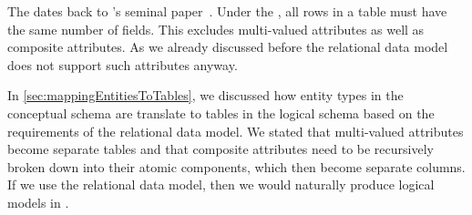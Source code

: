 %
\label{sec:normalForm:1}%
%
The  dates back to \citeauthor{C1970ARMODFLSDB}'s seminal paper~\cite{C1970ARMODFLSDB}.
Under the , all rows in a table must have the same number of fields.
This excludes multi-valued attributes as well as composite attributes.
As we already discussed before the relational data model does not support such attributes anyway.

In \cref{sec:mappingEntitiesToTables}, we discussed how entity types in the conceptual schema are translate to tables in the logical schema based on the requirements of the relational data model.
We stated that multi-valued attributes become separate tables and that composite attributes need to be recursively broken down into their atomic components, which then become separate columns.
If we use the relational data model, then we would naturally produce logical models in .%
%
\endhsection%
%
